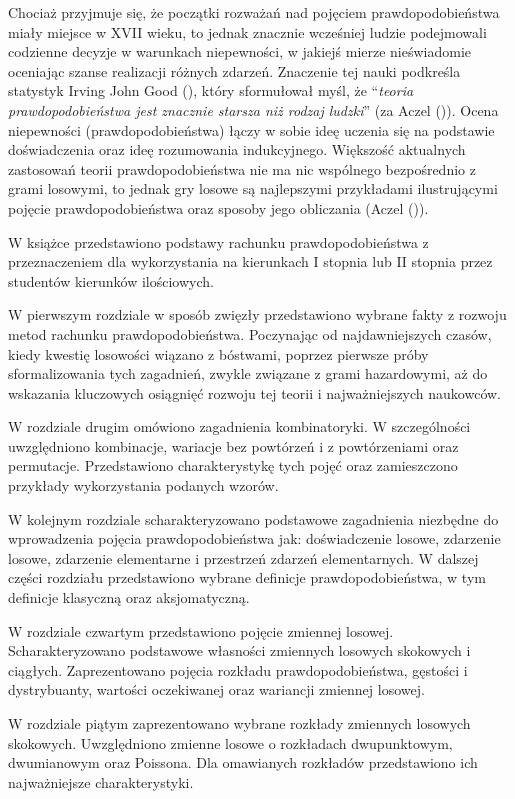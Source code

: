 \documentclass[
  letterpaper,
  DIV=11,
  numbers=noendperiod]{scrreprt}
\begin{document}
Chociaż przyjmuje się, że początki rozważań nad pojęciem
prawdopodobieństwa miały miejsce w XVII wieku, to jednak znacznie
wcześniej ludzie podejmowali codzienne decyzje w warunkach niepewności,
w jakiejś mierze nieświadomie oceniając szanse realizacji różnych
zdarzeń. Znaczenie tej nauki podkreśla statystyk Irving John Good
(), który sformułował myśl, że
``\emph{teoria prawdopodobieństwa jest znacznie starsza niż rodzaj
ludzki}'' (za Aczel ()). Ocena
niepewności (prawdopodobieństwa) łączy w sobie ideę uczenia się na
podstawie doświadczenia oraz ideę rozumowania indukcyjnego. Większość
aktualnych zastosowań teorii prawdopodobieństwa nie ma nic wspólnego
bezpośrednio z grami losowymi, to jednak gry losowe są najlepszymi
przykładami ilustrującymi pojęcie prawdopodobieństwa oraz sposoby jego
obliczania (Aczel ()).

W książce przedstawiono podstawy rachunku prawdopodobieństwa z
przeznaczeniem dla wykorzystania na kierunkach I stopnia lub II stopnia
przez studentów kierunków ilościowych.

W pierwszym rozdziale w sposób zwięzły przedstawiono wybrane fakty z
rozwoju metod rachunku prawdopodobieństwa. Poczynając od najdawniejszych
czasów, kiedy kwestię losowości wiązano z bóstwami, poprzez pierwsze
próby sformalizowania tych zagadnień, zwykle związane z grami
hazardowymi, aż do wskazania kluczowych osiągnięć rozwoju tej teorii i
najważniejszych naukowców.

W rozdziale drugim omówiono zagadnienia kombinatoryki. W szczególności
uwzględniono kombinacje, wariacje bez powtórzeń i z powtórzeniami oraz
permutacje. Przedstawiono charakterystykę tych pojęć oraz zamieszczono
przykłady wykorzystania podanych wzorów.

W kolejnym rozdziale scharakteryzowano podstawowe zagadnienia niezbędne
do wprowadzenia pojęcia prawdopodobieństwa jak: doświadczenie losowe,
zdarzenie losowe, zdarzenie elementarne i przestrzeń zdarzeń
elementarnych. W dalszej części rozdziału przedstawiono wybrane
definicje prawdopodobieństwa, w tym definicje klasyczną oraz
aksjomatyczną.

W rozdziale czwartym przedstawiono pojęcie zmiennej losowej.
Scharakteryzowano podstawowe własności zmiennych losowych skokowych i
ciągłych. Zaprezentowano pojęcia rozkładu prawdopodobieństwa, gęstości i
dystrybuanty, wartości oczekiwanej oraz wariancji zmiennej losowej.

W rozdziale piątym zaprezentowano wybrane rozkłady zmiennych losowych
skokowych. Uwzględniono zmienne losowe o rozkładach dwupunktowym,
dwumianowym oraz Poissona. Dla omawianych rozkładów przedstawiono ich
najważniejsze charakterystyki.
\end{document}
